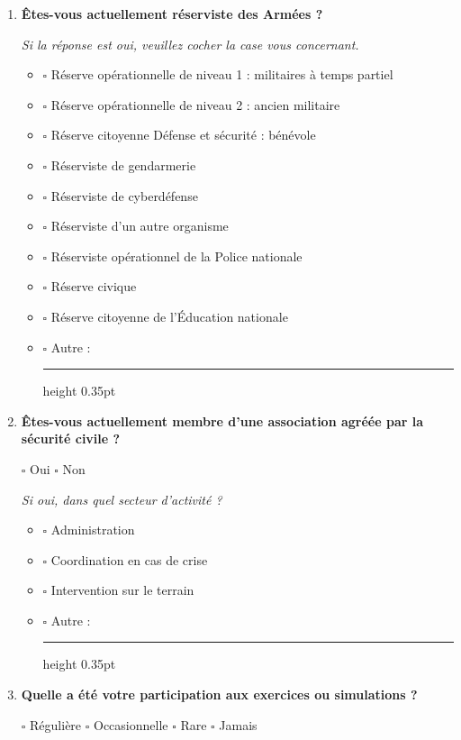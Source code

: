 \documentclass[12pt,a4paper]{article}
\newcommand{\Case}{\(\square\)}
\newcommand{\Ligne}{\leavevmode\leaders\hrule height 0.35pt\hfill\kern0pt}
\newcommand{\Question}[1]{\item \textbf{#1}\par\vspace{0.1em}}
\newcommand{\Consigne}[1]{\par{\small\itshape #1}\par}
\begin{document}
\begin{enumerate}[label=\textbf{\arabic*.},leftmargin=0pt,itemindent=1.9em,labelwidth=1.4em,labelsep=0.5em,resume]
\Ligne

\Question{Êtes-vous actuellement réserviste des Armées ?}

\Consigne{Si la réponse est oui, veuillez cocher la case vous concernant.}

\begin{itemize}[leftmargin=1.5cm]
    \item[] \Case{} Réserve opérationnelle de niveau 1 : militaires à temps partiel
    \item[] \Case{} Réserve opérationnelle de niveau 2 : ancien militaire
    \item[] \Case{} Réserve citoyenne Défense et sécurité : bénévole
    \item[] \Case{} Réserviste de gendarmerie
    \item[] \Case{} Réserviste de cyberdéfense
    \item[] \Case{} Réserviste d'un autre organisme
    \item[] \Case{} Réserviste opérationnel de la Police nationale
    \item[] \Case{} Réserve civique
    \item[] \Case{} Réserve citoyenne de l'Éducation nationale
    \item[] \Case{} Autre : \Ligne
\end{itemize}

\Question{Êtes-vous actuellement membre d'une association agréée par la sécurité civile ?}

\Case{} Oui \hspace{1cm} \Case{} Non

\Consigne{Si oui, dans quel secteur d'activité ?}

\begin{itemize}[leftmargin=1.5cm]
    \item[] \Case{} Administration
    \item[] \Case{} Coordination en cas de crise
    \item[] \Case{} Intervention sur le terrain
    \item[] \Case{} Autre : \Ligne
\end{itemize}

\Question{Quelle a été votre participation aux exercices ou simulations ?}

\Case{} Régulière \hspace{1cm} \Case{} Occasionnelle \hspace{1cm} \Case{} Rare \hspace{1cm} \Case{} Jamais


\end{enumerate}
\end{document}
